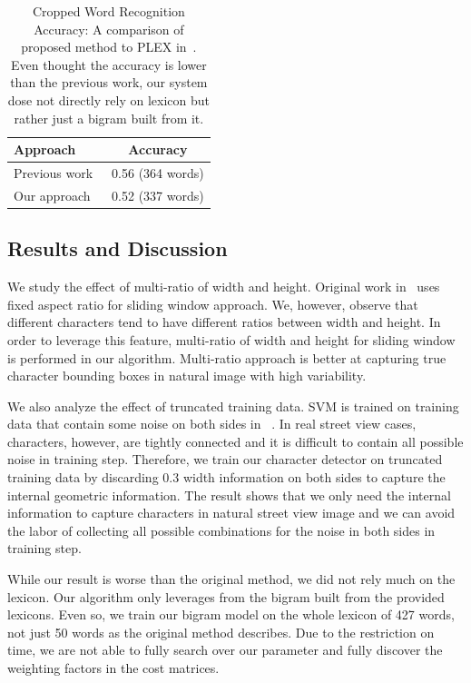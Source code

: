 \documentclass[10pt,twocolumn,letterpaper]{article}
\begin{document}
\begin{table}
\begin{center}
\begin{tabular}{|l|c|}
\hline
Approach & Accuracy \\
\hline\hline
Previous work~\cite{417}  & 0.56 (364 words) \\
Our approach & 0.52 (337 words)\\
\hline
\end{tabular}
\end{center}
\caption{Cropped Word Recognition Accuracy: A comparison of proposed method to PLEX in~\cite{417}. Even thought the accuracy is lower than the previous work, our system dose not directly rely on lexicon but rather just a bigram built from it.}
\label{table:compare}
\end{table}

\subsection{Results and Discussion}

We study the effect of multi-ratio of width and height. Original work in~\cite{417} uses fixed aspect ratio for sliding window approach. We, however, observe that different characters tend to have different ratios between width and height. In order to leverage this feature, multi-ratio of width and height for sliding window is performed in our algorithm. Multi-ratio approach is better at capturing true character bounding boxes in natural image with high variability.

We also analyze the effect of truncated training data. SVM is trained on training data that contain some noise on both sides in~\cite{417} . In real street view cases, characters, however, are tightly connected and it is difficult to contain all possible noise in training step. Therefore, we train our character detector on truncated training data by discarding $0.3$ width information on both sides to capture the internal geometric information. The result shows that we only need the internal information to capture characters in natural street view image and we can avoid the labor of collecting all possible combinations for the noise in both sides in training step.

While our result is worse than the original method, we did not rely much on the lexicon. Our algorithm only leverages from the bigram built from the provided lexicons. Even so, we train our bigram model on the whole lexicon of 427 words, not just 50 words as the original method describes. Due to the restriction on time, we are not able to fully search over our parameter and fully discover the weighting factors in the cost matrices.
\end{document}
